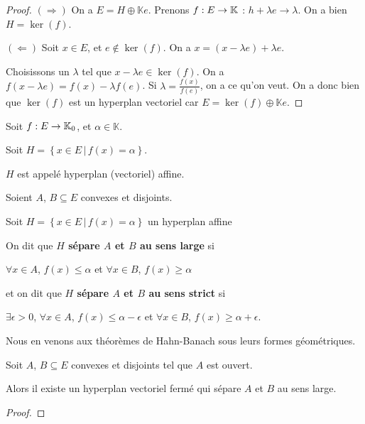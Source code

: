 \begin{proof}
	$(\Rightarrow)$ On a $E = H \oplus \mathbb{K}e$. Prenons
	$f : E \rightarrow \mathbb{K}$ : $h + \lambda e \rightarrow \lambda$.
	On a bien $H = \ker(f)$.

	$(\Leftarrow)$ Soit $x \in E$, et $e \notin \ker(f)$. On a $x = (x - \lambda
	e) + \lambda e$.

	Choisissons un $\lambda$ tel que $x - \lambda e \in
	\ker(f)$. On a $f(x - \lambda e) = f(x) - \lambda f(e)$. Si $\lambda =
	\frac{f(x)}{f(e)}$, on a ce qu'on veut.
	On a donc bien que $\ker(f)$ est un hyperplan vectoriel car $E = \ker(f)
	\oplus \mathbb{K}e$.
\end{proof}

\begin{definition} 
	Soit $f : E \rightarrow \mathbb{K}_{0}$, et $\alpha \in \mathbb{K}$.

	Soit $H = \left\{ x \in E \, | \, f(x) = \alpha \right\}$.

	$H$ est appelé hyperplan (vectoriel) affine.
\end{definition}


\begin{definition}
	Soient $A$, $B \subseteq E$ convexes et disjoints.

	Soit $H = \left\{ x \in E \, | \, f(x) = \alpha\right\}$ un hyperplan affine

	On dit que \textbf{$H$ sépare $A$ et $B$ au sens large} si

	$\forall x \in A$, $f(x) \leq \alpha$ et $\forall x \in B$, $f(x) \geq
	\alpha$

	et on dit que \textbf{$H$ sépare $A$ et $B$ au sens strict} si

	$\exists \epsilon > 0$, $\forall x \in A$, $f(x) \leq \alpha -
	\epsilon$ et $\forall x \in B$, $f(x) \geq \alpha + \epsilon$.
\end{definition}

Nous en venons aux théorèmes de Hahn-Banach sous leurs formes géométriques.

\begin{theorem} 
	Soit $A$, $B \subseteq E$ convexes et disjoints tel que $A$ est ouvert.

	Alors il existe un hyperplan vectoriel fermé qui sépare $A$ et $B$ au sens
	large.
\end{theorem}

\begin{proof}

\end{proof}

